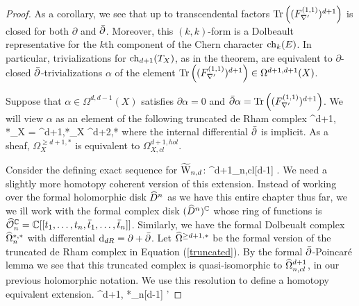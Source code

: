 \documentclass[10pt]{amsart}
\begin{document}
\begin{proof}
As a corollary, we see that up to transcendental factors ${\rm Tr} \left((F_{\nabla'}^{(1,1)})^{d+1}\right)$ is closed for both $\partial$ and $\Bar{\partial}$. 
Moreover, this $(k,k)$-form is a Dolbeault representative for the
$k$th component of the Chern character ${\rm ch}_{k}(E)$. 
In particular, trivializations for ${\rm ch}_{d+1}(T_X)$, as in the theorem, 
are equivalent to $\partial$-closed $\Bar{\partial}$-trivializations $\alpha$ of the element ${\rm Tr}\left( (F_{\nabla '}^{(1,1)})^{d+1} \right) \in \Omega^{d+1,d+1}(X)$.

Suppose that $\alpha \in \Omega^{d,d-1}(X)$ satisfies $\partial \alpha = 0$ and $\Bar{\partial} \alpha = {\rm Tr}\left( (F_{\nabla '}^{(1,1)})^{d+1} \right)$.
We will view $\alpha$ as an element of the following truncated de Rham complex
\be\label{truncated}
\Omega^{\geq d+1, *}_X = \Omega^{d+1,*}_X \xto{\partial} \Omega^{d+2,*} \to \cdots
\ee
where the internal differential $\Bar{\partial}$ is implicit.
As a sheaf, $\Omega^{\geq d+1,*}_X$ is equivalent to $\Omega^{d+1,hol}_{X,cl}$. 

Consider the defining exact sequence for $\widetilde{\rm W}_{n,d}$: 
 \to \hOmega^{d+1}_{n,cl}[d-1] \to \TVectd \to \Vect {} .
\een
We need a slightly more homotopy coherent version of this extension.
Instead of working over the formal holomorphic disk $\widehat{D}^n$ as we have this entire chapter thus far, we we ill work with the formal complex disk $(\widehat{D}^n)^{\mathbb C}$ whose ring of functions is $\widehat{\mathcal O}_n^{\mathbb C} = \mathbb C[[t_1,\ldots,t_n,\Bar{t}_1,\ldots,\Bar{t}_n]]$. 
Similarly, we have the formal Dolbeualt complex $\widehat{\Omega}^{*,*}_n$ with differential ${\rm d}_{dR} = \partial + \Bar{\partial}$. 
Let $\widehat{\Omega}^{\geq d+1, *}$ be the formal version of the truncated de Rham complex in Equation (\ref{truncated}). 
By the formal $\Bar{\partial}$-Poincar\'e lemma we see that this truncated complex is quasi-isomorphic to $\widehat{\Omega}^{d+1}_{n,cl}$, in our previous holomorphic notation. 
We use this resolution to define a homotopy equivalent extension. 
 \to \hOmega^{\geq d+1, *}_n[d-1] \to \TVectd' \to \Vect {}
\een


\end{proof}
\end{document}
